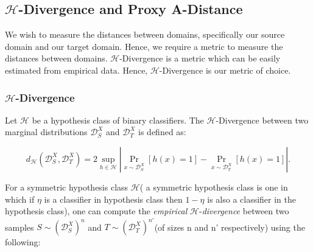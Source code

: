 \documentclass{article}
\begin{document}


\subsection{$\mathcal{H}$-Divergence and Proxy A-Distance}

We wish to measure the distances between domains, specifically our source domain and our target domain. Hence, we require a metric to measure the distances between domains. $\mathcal{H}$-Divergence is a metric which can be easily estimated from empirical data. Hence, $\mathcal{H}$-Divergence is our metric of choice.

\subsubsection{$\mathcal{H}$-Divergence}

Let \( \mathcal{H} \) be a hypothesis class of binary classifiers. The $\mathcal{H}$-Divergence between two marginal distributions \( \mathcal{D}_S^X \) and \( \mathcal{D}_T^X \) is defined as:

\begin{equation}
d_{\mathcal{H}}(\mathcal{D}_S^X, \mathcal{D}_T^X) = 2 \sup_{h \in \mathcal{H}} \left| \Pr_{x \sim \mathcal{D}_S^X}[h(x) = 1] - \Pr_{x \sim \mathcal{D}_T^X}[h(x) = 1] \right|.
\end{equation}

For a symmetric hypothesis class $\mathcal{H}$( a symmetric hypothesis class is one in which if $\eta$ is a classifier in hypothesis class then $1 - \eta$ is also a classifier in the hypothesis class), one can compute the \textit{empirical} $\mathcal{H}$-\textit{divergence} between two samples $S \sim (\mathcal{D}_S^X)^n$ and $T \sim (\mathcal{D}_T^X)^{n'}$(of sizes n and n' respectively) using the following:
\end{document}
